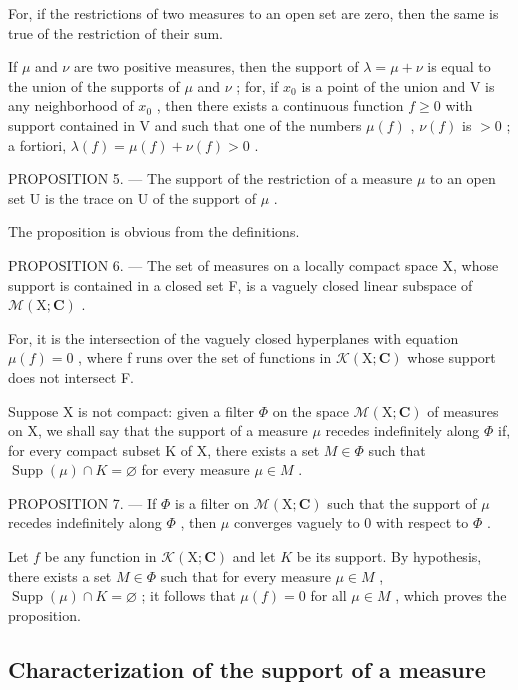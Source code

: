 For, if the restrictions of two measures to an open set are zero, then the same is true of the restriction of their sum.

If \(\mu\) and \(\nu\) are two positive measures, then the support of \(\lambda = \mu + \nu\) is equal to the union of the supports of \(\mu\) and \(\nu\) ; for, if \(x_0\) is a point of the union and V is any neighborhood of \(x_0\) , then there exists a continuous function \(f \geqslant 0\) with support contained in V and such that one of the numbers \(\mu(f)\) , \(\nu(f)\) is \(>0\) ; a fortiori, \(\lambda(f) = \mu(f) + \nu(f) > 0\) .

PROPOSITION 5. --- The support of the restriction of a measure \(\mu\) to an open set U is the trace on U of the support of \(\mu\) .

The proposition is obvious from the definitions.

PROPOSITION 6. --- The set of measures on a locally compact space X, whose support is contained in a closed set F, is a vaguely closed linear subspace of \(\mathcal{M}(\mathrm{X};\mathbf{C})\) .

For, it is the intersection of the vaguely closed hyperplanes with equation \(\mu(f) = 0\) , where f runs over the set of functions in \(\mathcal{K}(\mathrm{X};\mathbf{C})\) whose support does not intersect F.

Suppose X is not compact: given a filter \(\Phi\) on the space \(\mathcal{M}(\mathrm{X};\mathbf{C})\) of measures on X, we shall say that the support of a measure \(\mu\) recedes indefinitely along \(\Phi\) if, for every compact subset K of X, there exists a set \(M\in\Phi\) such that \(\operatorname{Supp}(\mu)\cap K=\varnothing\) for every measure \(\mu\in M\) .

PROPOSITION 7. --- If \(\Phi\) is a filter on \(\mathcal{M}(\mathrm{X};\mathbf{C})\) such that the support of \(\mu\) recedes indefinitely along \(\Phi\) , then \(\mu\) converges vaguely to 0 with respect to \(\Phi\) .

Let \(f\) be any function in \(\mathcal{K}(\mathrm{X};\mathbf{C})\) and let \(K\) be its support. By hypothesis, there exists a set \(M \in \Phi\) such that for every measure \(\mu \in M\) , \(\operatorname{Supp}(\mu) \cap K = \varnothing\) ; it follows that \(\mu(f) = 0\) for all \(\mu \in M\) , which proves the proposition.

\subsection{Characterization of the support of a measure}

